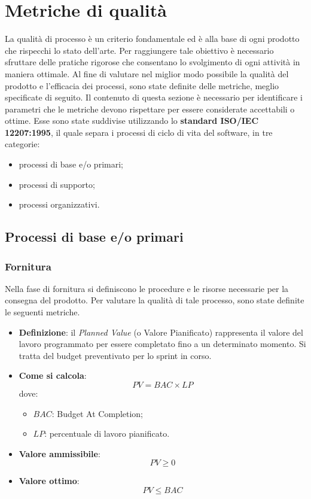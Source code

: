 \section{Metriche di qualità}
La qualità di processo è un criterio fondamentale ed è alla base di ogni prodotto che rispecchi lo stato dell'arte. Per raggiungere tale obiettivo è necessario sfruttare delle pratiche rigorose che consentano lo svolgimento di ogni attività in maniera ottimale. Al fine di valutare nel miglior modo possibile la qualità del prodotto e l'efficacia dei processi, sono state definite delle metriche, meglio specificate di seguito. Il contenuto di questa sezione è necessario per identificare i parametri che le metriche devono rispettare per essere considerate accettabili o ottime. Esse sono state suddivise utilizzando lo \textbf{standard ISO/IEC 12207:1995}, il quale separa i processi di ciclo di vita del software, in tre categorie: %
\begin{itemize}
	\item processi di base e/o primari;
	\item processi di supporto;
	\item processi organizzativi.
\end{itemize}

\subsection{Processi di base e/o primari}

\subsubsection{Fornitura}
Nella fase di fornitura si definiscono le procedure e le risorse necessarie per la consegna del prodotto. Per valutare la qualità di tale processo, sono state definite le seguenti metriche.

\hypertarget{1M}{}
\begin{itemize}
	\item \textbf{Definizione}: il \textit{Planned Value} (o Valore Pianificato) rappresenta il valore del lavoro programmato per essere completato fino a un determinato momento. Si tratta del budget preventivato per lo sprint in corso.
	\item \textbf{Come si calcola}: \begin{equation*}PV = BAC \times LP\end{equation*} dove:
		\begin{itemize}
			\item $BAC$: Budget At Completion;
			\item $LP$: percentuale di lavoro pianificato.
		\end{itemize}
	\item \textbf{Valore ammissibile}: \begin{equation*}PV \geq 0\end{equation*}
	\item \textbf{Valore ottimo}: \begin{equation*}PV \leq BAC\end{equation*}
\end{itemize}

